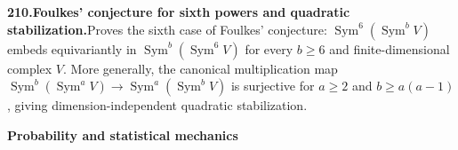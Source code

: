 \documentclass[11pt,a4paper]{article}
\begin{document}
  \par \begin{minipage}{\linewidth}
  \fontsize{10.5}{12.6}\selectfont\RaggedRight
  \hypertarget{result 210}{}
  {\bfseries\textcolor{muted}{210.}\enspace Foulkes’ conjecture for sixth powers and quadratic stabilization.}\enspace Proves the sixth case of Foulkes’ conjecture: $\operatorname{Sym}^6(\operatorname{Sym}^bV)$ embeds equivariantly in $\operatorname{Sym}^b(\operatorname{Sym}^6V)$ for every $b\ge6$ and finite-dimensional complex $V$. More generally, the canonical multiplication map $\operatorname{Sym}^b(\operatorname{Sym}^aV)\to\operatorname{Sym}^a(\operatorname{Sym}^bV)$ is surjective for $a\ge2$ and $b\ge a(a-1)$, giving dimension-independent quadratic stabilization.\par
  \end{minipage}\par\vspace{5pt}



  \par{}\addvspace{12pt}
  \hypertarget{subject 15}{}\label{subject 15}
  {\fontsize{15}{18}\selectfont\bfseries Probability and statistical mechanics\par}
  \nobreak\vspace{9pt}\nobreak
\end{document}
